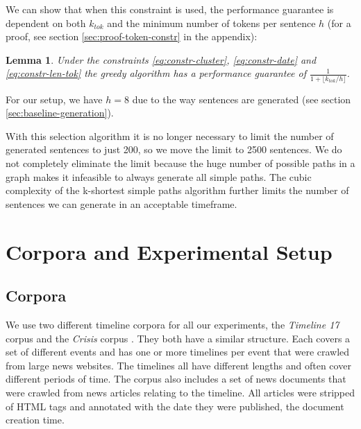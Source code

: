 \documentclass[a4paper,BCOR=10mm]{report}
\newtheorem{lemma}{Lemma}
\numberwithin{lemma}{chapter}
\numberwithin{definition}{chapter}
\begin{document}
We can show that when this constraint is used, the performance guarantee is dependent on both $k_{tok}$ and the minimum number of tokens per sentence $h$ (for a proof, see section \ref{sec:proof-token-constr} in the appendix):
\begin{lemma}
Under the constraints \ref{eq:constr-cluster}, \ref{eq:constr-date} and \ref{eq:constr-len-tok} the greedy algorithm has a performance guarantee of $\frac{1}{1 + \lfloor k_{\mathit{tok}} / h \rfloor}$.
\end{lemma}

For our setup, we have $h = 8$ due to the way sentences are generated (see section \ref{sec:baseline-generation}).





With this selection algorithm it is no longer necessary to limit the number of generated sentences to just 200, so we move the limit to 2500 sentences.
We do not completely eliminate the limit because the huge number of possible paths in a graph makes it infeasible to always generate all simple paths. The cubic complexity of the k-shortest simple paths algorithm further limits the number of sentences we can generate in an acceptable timeframe.

\chapter{Corpora and Experimental Setup} \label{sec:setup}

\section{Corpora} \label{sec:setup-corpora}

We use two different timeline corpora for all our experiments, the \textit{Timeline 17} corpus \citep{tran-tl17} and the \textit{Crisis} corpus \citep{tran-headlines}. They both have a similar structure. Each covers a set of different events and has one or more timelines per event that were crawled from large news websites. The timelines all have different lengths and often cover different periods of time. The corpus also includes a set of news documents that were crawled from news articles relating to the timeline. All articles were stripped of HTML tags and annotated with the date they were published, the document creation time.
\end{document}
